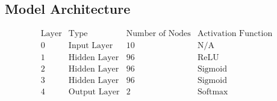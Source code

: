 \documentclass[12pt,a4paper]{article}
\begin{document}
\subsection{Model Architecture}

\[
\begin{array}{cccccc}
\text{Layer} & \text{Type} & \text{Number of Nodes} & \text{Activation Function} \\
\hline
0 & \text{Input Layer} & 10 & \text{N/A} \\
1 & \text{Hidden Layer} & 96 & \text{ReLU} \\
2 & \text{Hidden Layer} & 96 & \text{Sigmoid} \\
3 & \text{Hidden Layer} & 96 & \text{Sigmoid} \\
4 & \text{Output Layer} & 2 & \text{Softmax} \\
\end{array}
\]
\newpage
\end{document}
